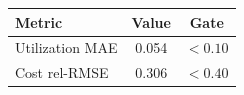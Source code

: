 \begin{tabular}{lcc}
\toprule
Metric & Value & Gate \\
\midrule
Utilization MAE & 0.054 & $< 0.10$ \\
Cost rel-RMSE & 0.306 & $< 0.40$ \\
\bottomrule
\end{tabular}
